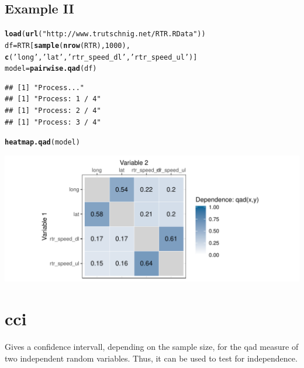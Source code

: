 \documentclass{scrartcl}\usepackage[]{graphicx}\usepackage[]{color}
\makeatletter
\def\maxwidth{ %
  \ifdim\Gin@nat@width>\linewidth
    \linewidth
  \else
    \Gin@nat@width
  \fi
}
\newcommand{\hlnum}[1]{\textcolor[rgb]{0.686,0.059,0.569}{#1}}%
\newcommand{\hlstr}[1]{\textcolor[rgb]{0.192,0.494,0.8}{#1}}%
\newcommand{\hlstd}[1]{\textcolor[rgb]{0.345,0.345,0.345}{#1}}%
\newcommand{\hlkwb}[1]{\textcolor[rgb]{0.69,0.353,0.396}{#1}}%
\newcommand{\hlkwd}[1]{\textcolor[rgb]{0.737,0.353,0.396}{\textbf{#1}}}%
\newenvironment{kframe}{%
 \def\at@end@of@kframe{}%
 \ifinner\ifhmode%
  \def\at@end@of@kframe{\end{minipage}}%
  \begin{minipage}{\columnwidth}%
 \fi\fi%
 \def\FrameCommand##1{\hskip\@totalleftmargin \hskip-\fboxsep
 \colorbox{shadecolor}{##1}\hskip-\fboxsep
     \hskip-\linewidth \hskip-\@totalleftmargin \hskip\columnwidth}%
 \MakeFramed {\advance\hsize-\width
   \@totalleftmargin\z@ \linewidth\hsize
   \@setminipage}}%
 {\par\unskip\endMakeFramed%
 \at@end@of@kframe}
\newenvironment{knitrout}{}{} %
\makeatother
\begin{document}
\subsection{Example II}
\begin{knitrout}
\color{fgcolor}\begin{kframe}
\begin{alltt}
  \hlkwd{load}\hlstd{(}\hlkwd{url}\hlstd{(}\hlstr{"http://www.trutschnig.net/RTR.RData"}\hlstd{))}
  \hlstd{df} \hlkwb{=} \hlstd{RTR[}\hlkwd{sample}\hlstd{(}\hlkwd{nrow}\hlstd{(RTR),}\hlnum{1000}\hlstd{),}
           \hlkwd{c}\hlstd{(}\hlstr{'long'}\hlstd{,}\hlstr{'lat'}\hlstd{,}\hlstr{'rtr_speed_dl'}\hlstd{,}\hlstr{'rtr_speed_ul'}\hlstd{)]}
  \hlstd{model} \hlkwb{=} \hlkwd{pairwise.qad}\hlstd{(df)}
\end{alltt}
\begin{verbatim}
## [1] "Process..."
## [1] "Process: 1 / 4"
## [1] "Process: 2 / 4"
## [1] "Process: 3 / 4"
\end{verbatim}
\begin{alltt}
  \hlkwd{heatmap.qad}\hlstd{(model)}
\end{alltt}
\end{kframe}
\includegraphics[width=\maxwidth]{figure/unnamed-chunk-3-1} 

\end{knitrout}

\section{cci}

Gives a confidence intervall, depending on the sample size, for the qad measure of two independent random variables. Thus, it can be used to test for independence.
\end{document}
